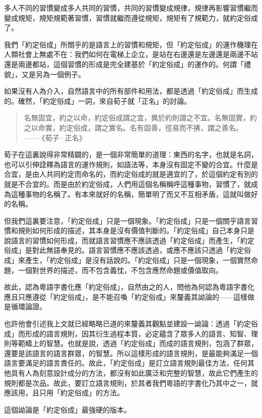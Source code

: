 \documentclass[a5paper, 12pt, openany]{book} %
\begin{document}
多人不同的習慣變成多人共同的習慣，共同的習慣變成規律，規律再影響習慣繼而變成規矩，規矩規範著習慣，習慣就繼而遵從規矩，規矩有了規範力，就約定俗成了。

我們「約定俗成」所關乎的是語言上的習慣和規矩，但「約定俗成」的運作機理在人類社會上無處不在：我們如何在電梯上企立，是站在右邊還是左邊還是兩邊不站還是兩邊都站，這個習慣的形成是完全建基於「約定俗成」的運作的。何謂「禮貌」，又是另為一個例子。

如果沒有人為介入，自然語言中的所有部件和用法，都是透過「約定俗成」而生成的。確然，「約定俗成」一詞，來自荀子就「正名」的討論。

\begin{quotation}
名無固宜，約之以命，約定俗成謂之宜，異於約則謂之不宜。名無固實，約之以命實，約定俗成，謂之實名。名有固善，徑易而不拂，謂之善名。
——《荀子·正名》
\end{quotation}

荀子在這裏說得非常精闢的，是一個非常簡單的道理：東西的名字，也就是名詞，也可以引伸詮釋為語言的運作規則，如語法等，本身沒有固定不變的合宜。什麼是合宜，是由人共同約定而命名的，而約定俗成的就是適宜的了，於這個約定有別的就是不合宜的。而是由於約定俗成，人們用這個名稱稱呼這種事物，習慣了，就成為這種事物的名稱了。有本來就好的名稱，簡單明了而又不互相矛盾，這就叫做好的名稱。

但我們這裏要注意，「約定俗成」只是一個現象。「約定俗成」只是一個關乎語言習慣和規則如何形成的描述，其本身是沒有價值判斷的。「約定俗成」自己本身只是說語言的習慣如何形成，而就語言習慣應不應該透過「約定俗成」而產生，「約定俗成」是對此無語奉見的。語言習慣應不應該透過，或應不應該只透過「約定俗成」來產生，「約定俗成」是沒有話說的。「約定俗成」只是一個現象，一個實然命題，一個對世界的描述，而不包含義忱，不包含應然命題或價值取向。

故此，認為粵語字書化應「約定俗成」，自然由之的人，問他為何認為粵語字書化應且只應遵從「約定俗成」，是不能召喚「約定俗成」來釐義其詏論的——這樣做是循環論證。

也許他會引述我上文就已經略略已道的來釐義其觀點並建設一詏論：透過「約定俗成」而形成的語言規則，因其衍生過程本質，必定蘊含了眾多人的語言、知智、理則等範疇上的智慧。也就是說，透過「約定俗成」而成的語言規則，包涵了群眾，還要是該語言的語言群眾，的智慧。所以這樣形成的語言規則，是最能夠滿足一個語言要滿足的語言責任的。故此，「約定俗成」是訂立語言規則最佳方法，任何其他具有人為刻意設計成分的方法，都沒有如此廣泛和完整的智慧，故此它們產生的規則都是次品。故此，要訂立語言規則，於其者我們粵語的字書化乃其中之一，就應該用，且只用「約定俗成」的方法。

這個詏論是「約定俗成」最強硬的版本。
\end{document}
